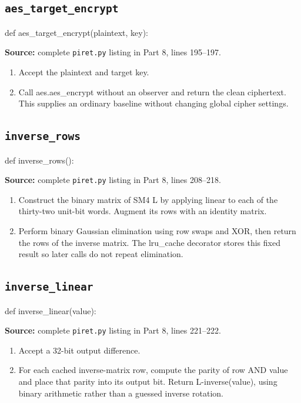 \subsection{\texttt{aes\_\allowbreak{}target\_\allowbreak{}encrypt}}
\begin{lightcode}
def aes_target_encrypt(plaintext, key):
\end{lightcode}
\noindent\textbf{Source:} complete \texttt{piret.py} listing in Part 8, lines 195--197.
\begin{enumerate}
\item Accept the plaintext and target key.
\item Call aes.aes\_encrypt without an observer and return the clean ciphertext. This supplies an ordinary baseline without changing global cipher settings.
\end{enumerate}
\subsection{\texttt{inverse\_\allowbreak{}rows}}
\begin{lightcode}
def inverse_rows():
\end{lightcode}
\noindent\textbf{Source:} complete \texttt{piret.py} listing in Part 8, lines 208--218.
\begin{enumerate}
\item Construct the binary matrix of SM4 L by applying linear to each of the thirty-two unit-bit words. Augment its rows with an identity matrix.
\item Perform binary Gaussian elimination using row swaps and XOR, then return the rows of the inverse matrix. The lru\_cache decorator stores this fixed result so later calls do not repeat elimination.
\end{enumerate}
\subsection{\texttt{inverse\_\allowbreak{}linear}}
\begin{lightcode}
def inverse_linear(value):
\end{lightcode}
\noindent\textbf{Source:} complete \texttt{piret.py} listing in Part 8, lines 221--222.
\begin{enumerate}
\item Accept a 32-bit output difference.
\item For each cached inverse-matrix row, compute the parity of row AND value and place that parity into its output bit. Return L-inverse(value), using binary arithmetic rather than a guessed inverse rotation.
\end{enumerate}
